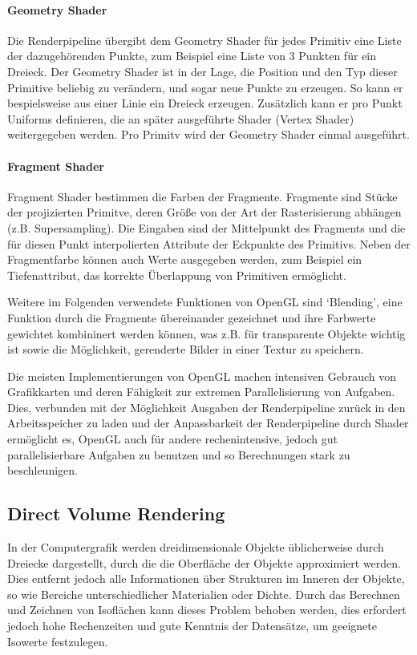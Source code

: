 \documentclass[a4paper,fontsize=12pt,toc=bib,halfparskip]{scrartcl}
\begin{document}
\paragraph{Geometry Shader}
Die Renderpipeline \"ubergibt dem Geometry Shader f\"ur jedes Primitiv eine Liste der dazugeh\"orenden Punkte, zum Beispiel eine Liste von 3 Punkten f\"ur ein Dreieck. Der Geometry Shader ist in der Lage, die Position und den Typ dieser Primitive beliebig zu ver\"andern, und sogar neue Punkte zu erzeugen. So kann er bespielsweise aus einer Linie ein Dreieck erzeugen. Zus\"atzlich kann er pro Punkt Uniforms definieren, die an sp\"ater ausgef\"uhrte Shader (Vertex Shader) weitergegeben werden. Pro Primitv wird der Geometry Shader einmal ausgef\"uhrt.

\paragraph{Fragment Shader}
Fragment Shader bestimmen die Farben der Fragmente. Fragmente sind St\"ucke der projizierten Primitve, deren Gr\"o{\ss}e von der Art der Rasterisierung abh\"angen (z.B. Supersampling). Die Eingaben sind der Mittelpunkt des Fragments und die f\"ur diesen Punkt interpolierten Attribute der Eckpunkte des Primitivs. Neben der Fragmentfarbe k\"onnen auch Werte ausgegeben werden, zum Beispiel ein Tiefenattribut, das korrekte \"Uberlappung von Primitiven erm\"oglicht.

Weitere im Folgenden verwendete Funktionen von OpenGL sind `Blending', eine Funktion durch die Fragmente \"ubereinander gezeichnet und ihre Farbwerte gewichtet kombininert werden k\"onnen, was z.B. f\"ur transparente Objekte wichtig ist sowie die M\"oglichkeit, gerenderte Bilder in einer Textur zu speichern.

Die meisten Implementierungen von OpenGL machen intensiven Gebrauch von Grafikkarten und deren F\"ahigkeit zur extremen Parallelisierung von Aufgaben. Dies, verbunden mit der M\"oglichkeit Ausgaben der Renderpipeline zur\"uck in den Arbeitsspeicher zu laden und der Anpassbarkeit der Renderpipeline durch Shader erm\"oglicht es, OpenGL auch f\"ur andere rechenintensive, jedoch gut parallelisierbare Aufgaben zu benutzen und so Berechnungen stark zu beschleunigen.

\subsection{Direct Volume Rendering}
In der Computergrafik werden dreidimensionale Objekte \"ublicherweise durch Dreiecke dargestellt, durch die die Oberfl\"ache der Objekte approximiert werden. Dies entfernt jedoch alle Informationen \"uber Strukturen im Inneren der Objekte, so wie Bereiche unterschiedlicher Materialien oder Dichte. Durch das Berechnen und Zeichnen von Isofl\"achen kann dieses Problem behoben werden, dies erfordert jedoch hohe Rechenzeiten und gute Kenntnis der Datens\"atze, um geeignete Isowerte festzulegen.
\end{document}
